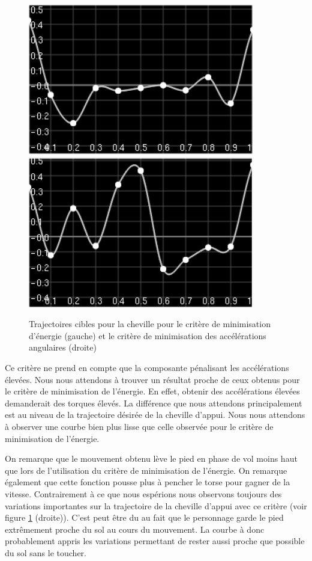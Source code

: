 \documentclass[runningheads,a4paper]{llncs}
\begin{document}
\begin{figure}[h]
\centering
\includegraphics[scale=0.5]{strips/stance_ankle_min_torque.png}
\includegraphics[scale=0.5]{strips/stance_ankle_min_acc.png}
\caption{Trajectoires cibles pour la cheville pour le critère de minimisation d'énergie (gauche) et le critère de minimisation des accélérations angulaires (droite)}
\label{fig:traj_ankle_min_torque}
\label{fig:traj_ankle_min_acc}
\end{figure}
Ce critère ne prend en compte que la composante pénalisant les accélérations élevées. Nous nous attendons à trouver un résultat proche de ceux obtenus pour le critère de minimisation de l'énergie. En effet, obtenir des accélérations élevées demanderait des torques élevés. La différence que nous attendons principalement est au niveau de la trajectoire désirée de la cheville d'appui. Nous nous attendons à observer une courbe bien plus lisse que celle observée pour le critère de minimisation de l'énergie.

On remarque que le mouvement obtenu lève le pied en phase de vol moins haut que lors de l'utilisation du critère de minimisation de l'énergie. On remarque également que cette fonction pousse plus à pencher le torse pour gagner de la vitesse.
 Contrairement à ce que nous espérions nous observons toujours des variations importantes sur la trajectoire de la cheville d'appui avec ce critère (voir figure \ref{fig:traj_ankle_min_acc} (droite)). C'est peut être du au fait que le personnage garde le pied extrêmement proche du sol au cours du mouvement. La courbe à donc probablement appris les variations permettant de rester aussi proche que possible du sol sans le toucher.
\end{document}
